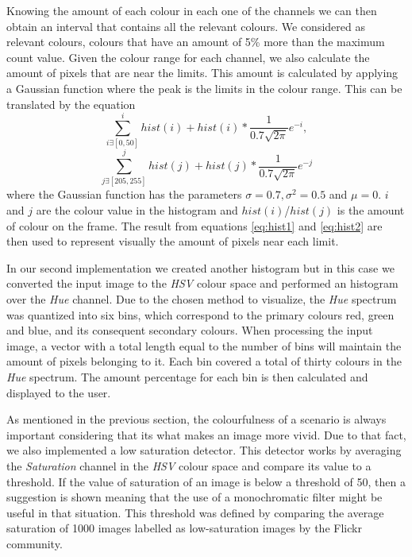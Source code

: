 Knowing the amount of each colour in each one of the channels we can then obtain an interval that contains all the relevant colours. We considered as relevant colours, colours that have an amount of 5\% more than the maximum count value.
Given the colour range for each channel, we also calculate the amount of pixels that are near the limits. This amount is calculated by applying a Gaussian function where the peak is the limits in the colour range. This can be translated by the equation
\begin{equation}
	\sum_{i \exists [0,50]}^{i}hist(i) + hist(i)*\frac{1}{0.7\sqrt{2\pi}}e^{-i},
	\label{eq:hist1}
\end{equation}
\begin{equation}
	\sum_{j \exists [205,255]}^{j}hist(j) + hist(j)*\frac{1}{0.7\sqrt{2\pi}}e^{-j}
	\label{eq:hist2}
\end{equation}
where the Gaussian function has the parameters $\sigma = 0.7, \sigma^{2} = 0.5$ and $\mu = 0$. $i$ and $j$ are the colour value in the histogram and $hist(i)$/$hist(j)$ is the amount of colour on the frame. The result from equations \ref{eq:hist1} and \ref{eq:hist2} are then used to represent visually the amount of pixels near each limit. 

In our second implementation we created another histogram but in this case we converted the input image to the \emph{HSV} colour space and performed an histogram over the \emph{Hue} channel. Due to the chosen method to visualize, the \emph{Hue} spectrum was quantized into six bins, which correspond to the primary colours red, green and blue, and its consequent secondary colours.
When processing the input image, a vector with a total length equal to the number of bins will maintain the amount of pixels belonging to it. Each bin covered a total of thirty colours in the \emph{Hue} spectrum. The amount percentage for each bin is then calculated and displayed to the user.

As mentioned in the previous section, the colourfulness of a scenario is always important considering that its what makes an image more vivid. Due to that fact, we also implemented a low saturation detector. This detector works by averaging the \emph{Saturation} channel in the \emph{HSV} colour space and compare its value to a threshold. If the value of saturation of an image is below a threshold of 50, then a suggestion is shown meaning that the use of a monochromatic filter might be useful in that situation. This threshold was defined by comparing the average saturation of 1000 images labelled as low-saturation images by the Flickr community.

